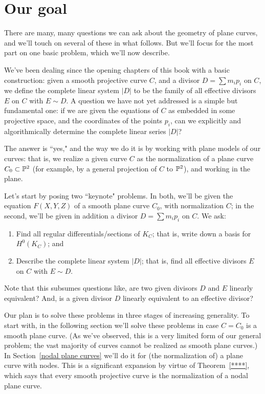 \section{Our goal}

There are many, many questions we can ask about the geometry of plane curves, and we'll touch on several of these in what follows. But we'll focus for the most part on one basic problem, which we'll now describe.

We've been dealing since the opening chapters of this book with a basic construction: given a smooth projective curve $C$, and a divisor $D =  \sum m_ip_i$ on $C$, we define the complete linear system $|D|$ to be the family of all effective divisors $E$ on $C$ with $E \sim D$. A question we have not yet addressed  is a simple but fundamental one: if we are given the equations of $C$ as embedded in some projective space, and the coordinates of the points $p_i$, can we explicitly and algorithmically determine the complete linear series $|D|$?

The answer is ``yes," and the way we do it is by working with plane models of our curves: that is, we realize a given curve $C$ as the normalization of a plane curve $C_0 \subset {\mathbb P}^2$ (for example, by a general projection of $C$ to ${\mathbb P}^2$), and working in the plane. 

Let's start by posing two ``keynote" problems. In both, we'll be given the equation $F(X,Y,Z)$ of a smooth plane curve $C_0$, with normalization $C$; in the second, we'll be given in addition a divisor $D = \sum m_ip_i$ on $C$. We ask:
\begin{enumerate}
\item Find all regular differentials/sections of $K_C$; that is, write down a basis for $H^0(K_C)$; and
\item Describe the complete linear system $|D|$; that is, find all effective divisors $E$ on $C$ with $E \sim D$.
\end{enumerate}

Note that this subsumes questions like, are two given divisors $D$ and $E$ linearly equivalent? And, is a given divisor $D$ linearly equivalent to an effective divisor? 

Our plan is to solve these problems in three stages of increasing generality. To start with, in the following section we'll solve these problems in case $C = C_0$ is a smooth plane curve. (As we've observed, this is a very limited form of our general problem; the vast majority of curves cannot be realized as smooth plane curves.) In Section~\ref{nodal plane curves} we'll do it for (the normalization of) a plane curve with nodes. This is a significant expansion by virtue of Theorem~\ref{****}, which says that every smooth projective curve is the normalization of a nodal plane curve. 

